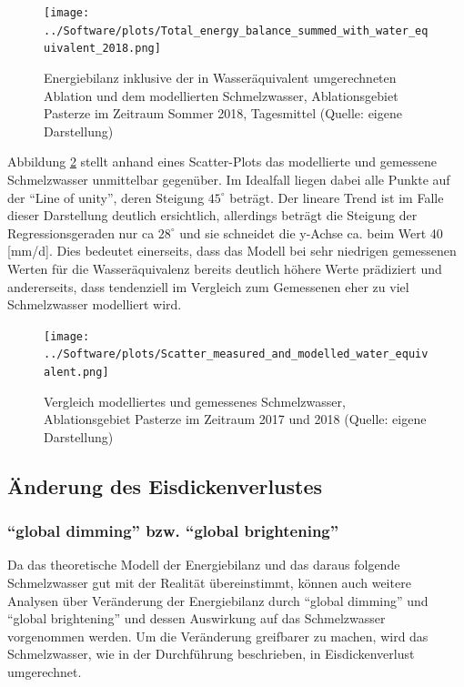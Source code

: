 \documentclass[11pt,a4paper]{article}
\begin{document}
\begin{figure}[H]
\centering
\texttt{[image: ../Software/plots/Total\_energy\_balance\_summed\_with\_water\_equivalent\_2018.png]}
\caption[Energiebilanz inklusive der in Wasseräquivalent umgerechneten Ablation und dem modellierten Schmelzwasser, Ablationsgebiet Pasterze im Zeitraum Sommer 2018, Tagesmittel]{Energiebilanz inklusive der in Wasseräquivalent umgerechneten Ablation und dem modellierten Schmelzwasser, Ablationsgebiet Pasterze im Zeitraum Sommer 2018, Tagesmittel (Quelle: eigene Darstellung)}
\label{Energiebilanz im Sommer 2018 inklusive der in Wasseräquivalent umgerechneten Ablation und dem modellierten Schmelzwasser}
\end{figure}


Abbildung \ref{Vergleich modelliertes und gemessenes Schmelzwasser} stellt  anhand eines Scatter-Plots das modellierte und gemessene Schmelzwasser unmittelbar gegenüber. Im Idealfall liegen dabei alle Punkte auf der ``Line of unity'', deren Steigung $45^\circ$ beträgt. Der lineare Trend ist im Falle dieser Darstellung deutlich ersichtlich, allerdings beträgt die Steigung der Regressionsgeraden nur ca $28^\circ$ und sie schneidet die y-Achse ca. beim Wert 40 [mm/d]. Dies bedeutet einerseits, dass das Modell bei sehr niedrigen gemessenen Werten für die Wasseräquivalenz bereits deutlich höhere Werte prädiziert und andererseits, dass tendenziell im Vergleich zum Gemessenen eher zu viel Schmelzwasser modelliert wird.

\begin{figure}[H]
\centering
\texttt{[image: ../Software/plots/Scatter\_measured\_and\_modelled\_water\_equivalent.png]}
\caption[Vergleich modelliertes und gemessenes Schmelzwasser, Ablationsgebiet Pasterze im Zeitraum 2017 und 2018]{Vergleich modelliertes und gemessenes Schmelzwasser, Ablationsgebiet Pasterze im Zeitraum 2017 und 2018 (Quelle: eigene Darstellung)}
\label{Vergleich modelliertes und gemessenes Schmelzwasser}
\end{figure}



\subsection{Änderung des Eisdickenverlustes}
\subsubsection{``global dimming'' bzw. ``global brightening''}
Da das theoretische Modell der Energiebilanz und das daraus folgende Schmelzwasser gut mit der Realität übereinstimmt, können auch weitere Analysen über Veränderung der Energiebilanz durch ``global dimming'' und ``global brightening'' und dessen Auswirkung auf das Schmelzwasser vorgenommen werden. Um die Veränderung greifbarer zu machen, wird das Schmelzwasser, wie in der Durchführung beschrieben, in Eisdickenverlust umgerechnet.\\
\end{document}
